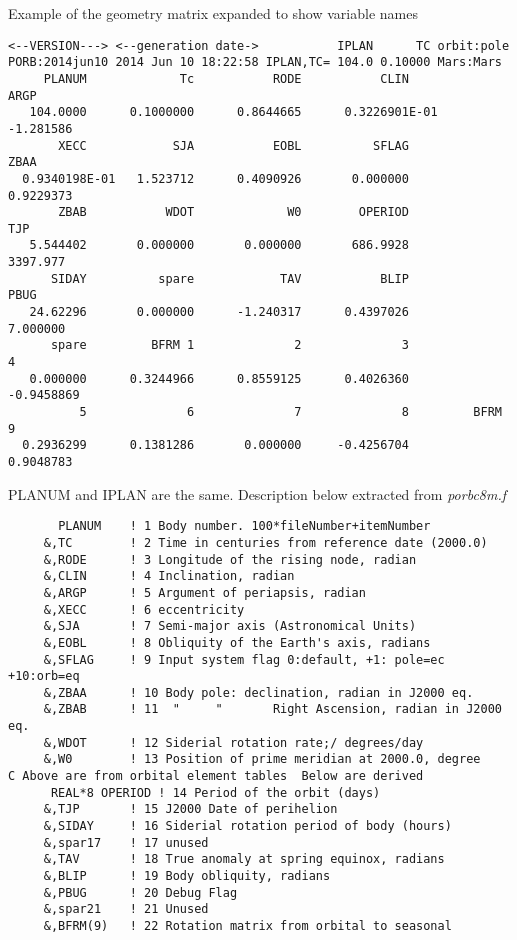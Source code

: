 \documentclass[draft]{article}
\newcommand{\nf}{\textit}  %
\begin{document}
Example of the geometry matrix expanded to show variable names
\vspace{-3.mm} 
\begin{verbatim}
<--VERSION---> <--generation date->           IPLAN      TC orbit:pole    
PORB:2014jun10 2014 Jun 10 18:22:58 IPLAN,TC= 104.0 0.10000 Mars:Mars
     PLANUM             Tc           RODE           CLIN           ARGP
   104.0000      0.1000000      0.8644665      0.3226901E-01  -1.281586  
       XECC            SJA           EOBL          SFLAG           ZBAA
  0.9340198E-01   1.523712      0.4090926       0.000000      0.9229373 
       ZBAB           WDOT             W0        OPERIOD            TJP 
   5.544402       0.000000       0.000000       686.9928       3397.977 
      SIDAY          spare            TAV           BLIP           PBUG 
   24.62296       0.000000      -1.240317      0.4397026       7.000000  
      spare         BFRM 1              2              3              4
   0.000000      0.3244966      0.8559125      0.4026360     -0.9458869 
          5              6              7              8         BFRM 9  
  0.2936299      0.1381286       0.000000     -0.4256704      0.9048783   
\end{verbatim} 

PLANUM and IPLAN are the same. Description below extracted from \nf{porbc8m.f}
\vspace{-3.mm} 
\begin{verbatim}
       PLANUM    ! 1 Body number. 100*fileNumber+itemNumber
     &,TC        ! 2 Time in centuries from reference date (2000.0)
     &,RODE      ! 3 Longitude of the rising node, radian
     &,CLIN      ! 4 Inclination, radian
     &,ARGP      ! 5 Argument of periapsis, radian
     &,XECC      ! 6 eccentricity
     &,SJA       ! 7 Semi-major axis (Astronomical Units)
     &,EOBL      ! 8 Obliquity of the Earth's axis, radians
     &,SFLAG     ! 9 Input system flag 0:default, +1: pole=ec +10:orb=eq
     &,ZBAA      ! 10 Body pole: declination, radian in J2000 eq.
     &,ZBAB      ! 11  "     "       Right Ascension, radian in J2000 eq.
     &,WDOT      ! 12 Siderial rotation rate;/ degrees/day  
     &,W0        ! 13 Position of prime meridian at 2000.0, degree
C Above are from orbital element tables  Below are derived    
      REAL*8 OPERIOD ! 14 Period of the orbit (days)
     &,TJP       ! 15 J2000 Date of perihelion
     &,SIDAY     ! 16 Siderial rotation period of body (hours)
     &,spar17    ! 17 unused
     &,TAV       ! 18 True anomaly at spring equinox, radians
     &,BLIP      ! 19 Body obliquity, radians
     &,PBUG      ! 20 Debug Flag   
     &,spar21    ! 21 Unused    
     &,BFRM(9)   ! 22 Rotation matrix from orbital to seasonal
\end{verbatim}
\end{document}
